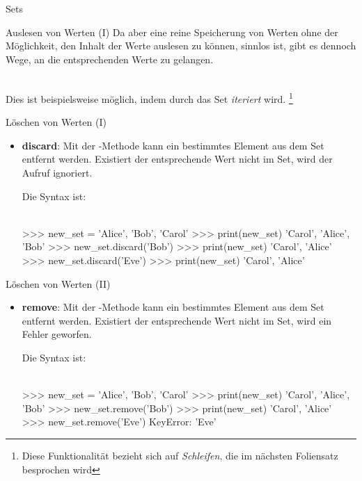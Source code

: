 \begin{subsection}{Sets}
\begin{frame}[fragile]{Auslesen von Werten (I)}
            Da aber eine reine Speicherung von Werten ohne der Möglichkeit, den Inhalt der Werte auslesen zu können, sinnlos ist, gibt es dennoch Wege, an die entsprechenden Werte zu gelangen. \\~\
            
            Dies ist beispielsweise möglich, indem durch das Set \textit{iteriert} wird. \footnote{Diese Funktionalität bezieht sich auf \textit{Schleifen}, die im nächsten Foliensatz besprochen wird}
        \end{frame}
        
        \begin{frame}[fragile]{Löschen von Werten (I)}
            \begin{itemize}
                \item \textbf{discard}: Mit der -Methode kann ein bestimmtes Element aus dem Set entfernt werden. Existiert der entsprechende Wert nicht im Set, wird der Aufruf ignoriert. 
                
                Die Syntax ist: \\~\
                
                
\begin{pyconcode}
>>> new_set = {'Alice', 'Bob', 'Carol'}
>>> print(new_set)
{'Carol', 'Alice', 'Bob'}
>>> new_set.discard('Bob')
>>> print(new_set)
{'Carol', 'Alice'}
>>> new_set.discard('Eve')
>>> print(new_set)
{'Carol', 'Alice'}
\end{pyconcode} 

            \end{itemize}
        \end{frame}
        
        
        \begin{frame}[fragile]{Löschen von Werten (II)}
            \begin{itemize}
                \item \textbf{remove}: Mit der -Methode kann ein bestimmtes Element aus dem Set entfernt werden. Existiert der entsprechende Wert nicht im Set, wird ein Fehler geworfen. 
                
                Die Syntax ist: \\~\
                
                
\begin{pyconcode}
>>> new_set = {'Alice', 'Bob', 'Carol'}
>>> print(new_set)
{'Carol', 'Alice', 'Bob'}
>>> new_set.remove('Bob')
>>> print(new_set)
{'Carol', 'Alice'}
>>> new_set.remove('Eve')
KeyError: 'Eve'
\end{pyconcode} 


\end{itemize}
\end{frame}
\end{subsection}
